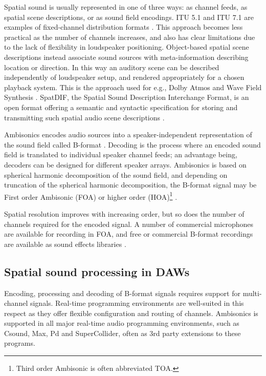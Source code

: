 \documentclass{article}
\begin{document}
Spatial sound is usually represented in one of three ways: as channel feeds, as spatial scene descriptions, or as sound field encodings.
ITU 5.1 and ITU 7.1 are examples of fixed-channel distribution formats \cite{ITU:1993_surround_5:1}.
This approach becomes less practical as the number of channels increases, and also has clear limitations due to the lack of flexibility in loudspeaker positioning.
Object-based spatial scene descriptions instead associate sound sources with meta-information describing location or direction. In this way an auditory scene can be described independently of loudspeaker setup, and rendered appropriately for a chosen playback system.
This is the approach used for e.g., Dolby Atmos and Wave Field Synthesis \cite{dolby:2014atmos,Berkhout:1993wfs}.
SpatDIF, the Spatial Sound Description Interchange Format, is an open format offering a semantic and syntactic specification for storing and transmitting such spatial audio scene descriptions \cite{Peters:2013spatdif}.

Ambisonics encodes audio sources into a speaker-inde\-pendent representation of the sound field called B-format  \cite{gerzon:1985JAES}.
Decoding is the process where an encoded sound field is translated to individual speaker channel feeds; an advantage being,  decoders can be designed for different speak\-er arrays.
Ambisonics is based on spherical harmonic decomposition of the sound field, and depending on truncation of the spherical harmonic decomposition, 
the B-for\-mat signal may be First order Ambisonic (FOA) or higher order (HOA)\footnote{Third order Ambisonic is often abbreviated TOA.} \cite{daniel:2001phd}.

Spatial resolution improves with increasing order, but so does the number of channels required for the encoded signal.
A number of commercial microphones are available for recording in FOA, and free or commercial B-format recordings are available as sound effects libraries \cite{farrar:1979soundfield,deleflie2014:ambisonia,darcourt:2014surlib}.




\subsection{Spatial sound processing in DAWs}\label{sec:daws}

Encoding, processing and decoding of B-format signals requires support for multi-channel signals.
Real-time programming environments are well-suited in this respect as they offer flexible configuration and routing of channels. Ambisonics is supported in all major real-time audio programming environments, such as Csound, Max, Pd and SuperCollider, often as 3rd party extensions to these programs.
\end{document}
